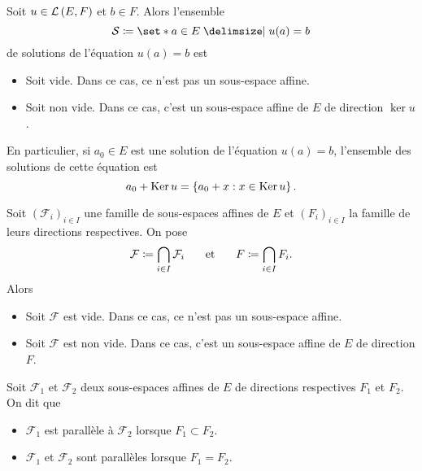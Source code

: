\documentclass{magnolia}
\begin{document}
\begin{proposition}
Soit $u\in\mathcal{L}\left(E,F\right)$ et $b\in F$. Alors l'ensemble
\[\mathcal{S}\defeq\enstq{a\in E}{u(a)=b}\]
de solutions de l'équation $u(a)=b$ est
\begin{itemize}
\item Soit vide. Dans ce cas, ce n'est pas un sous-espace affine.
\item Soit non vide. Dans ce cas, c'est un sous-espace affine de $E$ de direction $\ker u$.
\end{itemize}
\end{proposition}

\begin{remarqueUnique}
\remarque En particulier, si $a_0\in E$ est une solution de l'équation $u(a)=b$, l'ensemble
  des solutions de cette équation est
  \[a_0 + \mathop{\rm Ker} u = \left\{a_0+x : x\in\mathop{\rm Ker} u\right\}.\]
\end{remarqueUnique}

\begin{proposition}
Soit $(\mathcal{F}_i)_{i\in I}$ une famille de sous-espaces affines de $E$ et
$(F_i)_{i\in I}$ la famille de leurs directions respectives. On pose
\[\mathcal{F}\coloneqq\bigcap_{i\in I} \mathcal{F}_i \quad\quad\!\text{et}\quad\!\quad F\coloneqq\bigcap_{i\in I} F_i.\]
Alors
\begin{itemize}
\item Soit $\mathcal{F}$ est vide. Dans ce cas, ce n'est pas un sous-espace affine.
\item Soit $\mathcal{F}$ est non vide. Dans ce cas, c'est un sous-espace affine de
  $E$ de direction $F$.
\end{itemize}
\end{proposition}



  
\begin{definition}
Soit $\mathcal{F}_1$ et $\mathcal{F}_2$ deux sous-espaces affines de
$E$ de directions respectives $F_1$ et $F_2$. On dit que
\begin{itemize}
\item $\mathcal{F}_1$ est parallèle à $\mathcal{F}_2$ lorsque
  $F_1\subset F_2$.
\item $\mathcal{F}_1$ et $\mathcal{F}_2$ sont parallèles lorsque
  $F_1=F_2$.
\end{itemize}
\end{definition}
\end{document}
